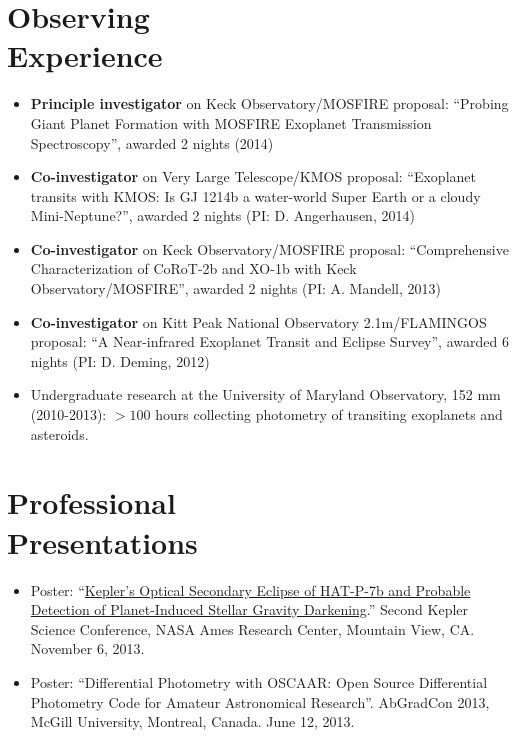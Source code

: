 \documentclass[margin]{res}
\begin{document}
\begin{resume}
\section{Observing\\Experience}
\begin{itemize}   
\item {\bf Principle investigator} on Keck Observatory/MOSFIRE proposal: ``Probing Giant Planet Formation with MOSFIRE Exoplanet Transmission Spectroscopy'', awarded 2 nights (2014)

\item {\bf Co-investigator} on Very Large Telescope/KMOS proposal: ``Exoplanet transits with KMOS: Is GJ 1214b a water-world Super Earth or a cloudy Mini-Neptune?'', awarded 2 nights (PI: D. Angerhausen, 2014)

\item {\bf Co-investigator} on Keck Observatory/MOSFIRE proposal: ``Comprehensive Characterization of CoRoT-2b and XO-1b with Keck Observatory/MOSFIRE'', awarded 2 nights (PI: A. Mandell, 2013)

\item {\bf Co-investigator} on Kitt Peak National Observatory 2.1m/FLAMINGOS proposal: ``A Near-infrared Exoplanet Transit and Eclipse Survey'', awarded 6 nights (PI: D. Deming, 2012)

\item Undergraduate research at the University of Maryland Observatory, 152 mm (2010-2013): $>100$ hours collecting photometry of transiting exoplanets and asteroids. \\
\end{itemize}



\section{Professional\\ Presentations} 
\begin{itemize}  %
\item Poster: ``\href{http://nexsci.caltech.edu/conferences/KeplerII/posters/morris.pdf}{Kepler's Optical Secondary Eclipse of HAT-P-7b and Probable Detection of Planet-Induced Stellar Gravity Darkening}.'' Second Kepler Science Conference, NASA Ames Research Center, Mountain View, CA. November 6, 2013. 

\item Poster: ``Differential Photometry with OSCAAR: Open Source Differential Photometry Code for Amateur Astronomical Research''. AbGradCon 2013, McGill University, Montreal, Canada. June 12, 2013.


\end{itemize}
\end{resume}
\end{document}
